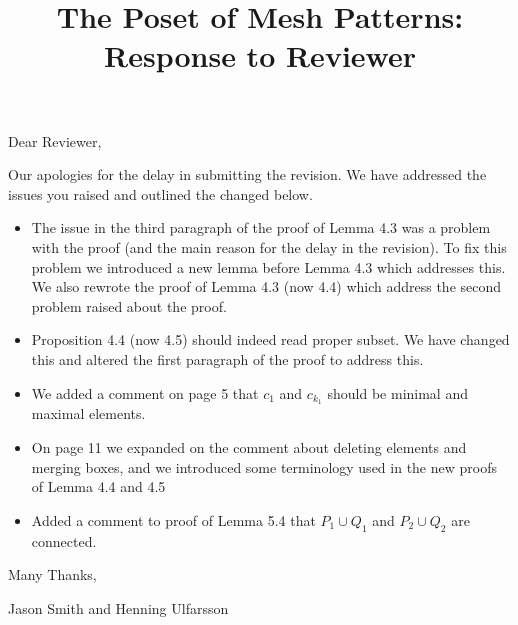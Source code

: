\documentclass{article}
\title{The Poset of Mesh Patterns:\\ Response to Reviewer}
\author{}
\date{}
\begin{document}
	\maketitle
	
	Dear Reviewer,

\vskip 20pt

Our apologies for the delay in submitting the revision. We have addressed
the issues you raised and outlined the changed below.

\begin{itemize}
\item The issue in the third paragraph of the proof of Lemma 4.3 was a problem with the proof
(and the main reason for the delay in the revision). To fix this problem we introduced 
a new lemma before Lemma 4.3 which addresses this. We also rewrote the proof of Lemma 4.3 (now 4.4)
which address the second problem raised about the proof.
\item Proposition 4.4 (now 4.5) should indeed read proper subset. We have changed this and
altered the first paragraph of the proof to address this.
\item We added a comment on page 5 that $c_1$ and $c_{k_1}$ should be minimal and maximal elements.
\item On page 11 we expanded on the comment about deleting elements and merging boxes, and we
introduced some terminology used in the new proofs of Lemma 4.4 and 4.5
\item Added a comment to proof of Lemma 5.4 that $P_1\cup Q_1$ and $P_2\cup Q_2$ are connected.
\end{itemize}
\vskip 20pt

Many Thanks,

Jason Smith and Henning Ulfarsson
\end{document}
